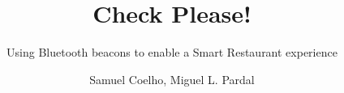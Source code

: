 \documentclass{./llncs2e/llncs}
\begin{document}
\title{Check Please!}

\subtitle{Using Bluetooth beacons to enable a Smart Restaurant experience}
\author{Samuel Coelho, Miguel L. Pardal}


\maketitle











\appendix





\end{document}
